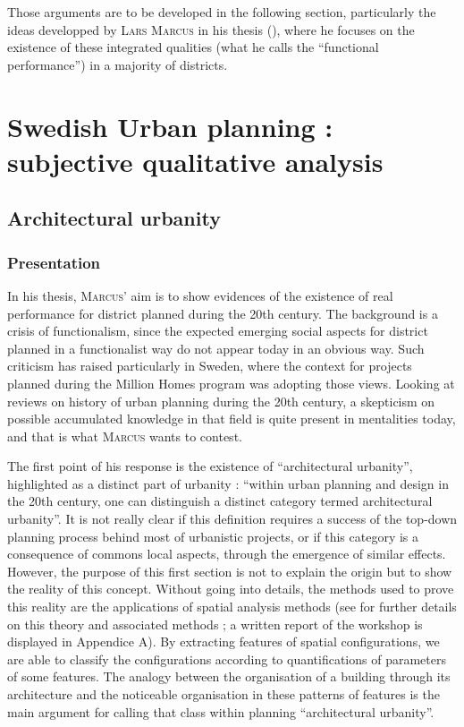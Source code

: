 \documentclass[english]{article}
\newcommand{\noun}[1]{\textsc{#1}}
\begin{document}
\bigskip{}


Those arguments are to be developed in the following section, particularly the
ideas developped by \noun{Lars Marcus} in his thesis (\cite{marcus2000architectural}),
where he focuses on the existence of these integrated qualities (what
he calls the ``functional performance'') in a majority of districts.


\section{Swedish Urban planning : subjective qualitative analysis}


\subsection{Architectural urbanity}


\subsubsection{Presentation}

In his thesis, \noun{Marcus'} aim is to show evidences of the existence
of real performance for district planned during the 20th century.
The background is a crisis of functionalism, since the expected emerging
social aspects for district planned in a functionalist way do not
appear today in an obvious way. Such criticism has raised particularly
in Sweden, where the context for projects planned during the Million
Homes program was adopting those views. Looking at reviews on history of urban
planning during the 20th century, a skepticism on possible accumulated
knowledge in that field is quite present in mentalities today, and
that is what \noun{Marcus} wants to contest.

\bigskip{}


The first point of his response is the existence of ``architectural
urbanity'', highlighted as a distinct part of urbanity : ``within
urban planning and design in the 20th century, one can distinguish
a distinct category termed architectural urbanity''. It is not really
clear if this definition requires a success of the top-down planning process behind
most of urbanistic projects, or if this category is a consequence
of commons local aspects, through the emergence of similar effects.
However, the purpose of this first section is not to explain the origin
but to show the reality of this concept. Without going into details,
the methods used to prove this reality are the applications of spatial analysis
methods (see \cite{workshopArchMorph} for further details on this
theory and associated methods ; a written report of the workshop is displayed
in Appendice A). By extracting features of spatial configurations,
we are able to classify the configurations according to quantifications
of parameters of some features. The analogy between the organisation
of a building through its architecture and the noticeable organisation
in these patterns of features is the main argument for calling that
class within planning ``architectural urbanity''.
\end{document}
